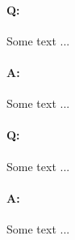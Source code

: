 \documentclass[a4paper,10pt]{article}
\begin{document}
    \paragraph{\bold Q:} Some text ...
    
    \paragraph{\bold A:} Some text ...

    \noindent
    \hrulefill

    \paragraph{\bold Q:} Some text ...

    \paragraph{\bold A:} Some text ...
\end{document}
